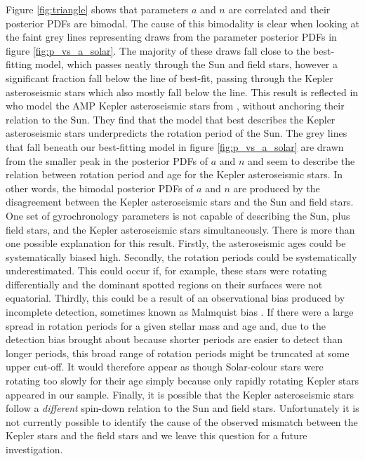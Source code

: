 \documentclass[useAMS, usenatbib]{mn2e}
\begin{document}
Figure \ref{fig:triangle} shows that parameters $a$ and $n$ are
correlated and their posterior PDFs are bimodal.
The cause of this bimodality is clear when looking at the faint grey lines
representing draws from the parameter posterior PDFs in
figure \ref{fig:p_vs_a_solar}.
The majority of these draws fall close to the best-fitting model, which passes
neatly through the Sun and field stars, however a significant fraction fall
below the line of best-fit, passing through the Kepler asteroseismic stars
which also mostly fall below the line.
This result is reflected in \citet{Garcia2014} who model the AMP
Kepler asteroseismic stars from \citet{Metcalfe2014}, without anchoring their
relation to the Sun.
They find that the model that best describes the Kepler asteroseismic stars
underpredicts the rotation period of the Sun.
The grey lines that fall beneath our best-fitting model in figure
\ref{fig:p_vs_a_solar} are drawn from the smaller peak in the posterior PDFs
of $a$ and $n$ and seem to describe the relation between rotation period and
age for the Kepler asteroseismic stars.
In other words, the bimodal posterior PDFs of $a$ and $n$ are produced by the
disagreement between the Kepler asteroseismic stars and the Sun and field
stars.
One set of gyrochronology parameters is not
capable of describing the Sun, plus field stars, and the Kepler
asteroseismic stars simultaneously.
There is more than one possible explanation for this result.
Firstly, the asteroseismic ages could be systematically biased high.
Secondly, the rotation periods could be systematically underestimated.
This could occur if, for example, these stars were rotating differentially
and the dominant spotted regions on their surfaces were not equatorial.
Thirdly, this could be a result of an observational bias produced by incomplete
detection, sometimes known as Malmquist bias \citep{Malmquist1920}.
If there were a large spread in rotation periods for a given stellar mass and
age and, due to the detection bias brought about because shorter periods are
easier to detect than longer periods, this broad range of rotation periods
might be truncated at some upper cut-off.
It would therefore appear as though Solar-colour stars were rotating too
slowly for their age simply because only rapidly rotating Kepler stars appeared
in our sample.
Finally, it is possible that the Kepler asteroseismic stars follow a
\emph{different} spin-down relation to the Sun and field stars. %
Unfortunately it is not currently possible to identify the cause of the
observed mismatch between the Kepler stars and the field stars and we leave
this question for a future investigation.
\end{document}
